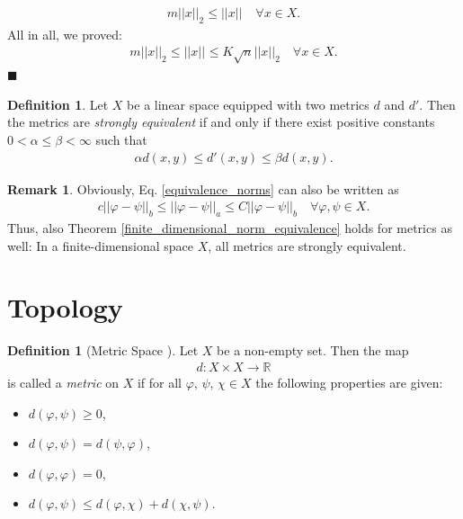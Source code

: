 \documentclass[12pt, a4paper]{article}
\numberwithin{equation}{section}
\theoremstyle{definition}
\theoremstyle{definition}
\newtheorem{defn}[thm]{Definition} %
\newtheorem{remark}[thm]{Remark} %
\newcommand{\norm}[2]{\left\vert\left\vert #1 \right\vert\right\vert_{#2}}
\begin{document}
	\begin{align}
		m\norm{x}{2} \leq \norm{x}{} \quad \forall x\in X.
	\end{align}
	All in all, we proved: 
	\begin{align}
		m\norm{x}{2} \leq \norm{x}{} \leq K\sqrt{n}\norm{x}{2} \quad \forall x\in X. 
	\end{align}
	\qquad\qquad\qquad\qquad\qquad\qquad\qquad\qquad\qquad\qquad\qquad\qquad\qquad\qquad\qquad\qquad\qquad\qquad\qquad\qquad\qquad\quad$\blacksquare$
	
	\begin{defn}
		Let $X$ be a linear space equipped with two metrics $d$ and $d'$. Then the metrics are \textit{strongly equivalent} if and only if there exist positive constants $0 < \alpha \leq \beta < \infty$ such that 
		\begin{align}
			\alpha d(x, y) \leq d'(x, y) \leq \beta d(x, y). 
		\end{align}
		\cite{equivalence-metrics}
	\end{defn}
	
	\begin{remark}\label{equivalence_metrics_finite_dimensional}
		Obviously, Eq. \eqref{equivalence_norms} can also be written as 
		\begin{align}
			c\norm{\varphi-\psi}{b} \leq \norm{\varphi-\psi}{a} \leq C\norm{\varphi-\psi}{b} \quad \forall \varphi, \psi\in X. 
		\end{align} 
		Thus, also Theorem \ref{finite_dimensional_norm_equivalence} holds for metrics as well: In a finite-dimensional space $X$, all metrics are strongly equivalent. 
	\end{remark}
	
	\newpage 
	\section{Topology}
	\begin{defn}[Metric Space \cite{fa2019}]\label{defn:metric_space}
		Let $X$ be a non-empty set. Then the map 
		\begin{align*}
			d: X\times X\rightarrow \mathbb R
		\end{align*}
		is called a \textit{metric} on $X$ if for all $\varphi$, $\psi$, $\chi\in X$ the following properties are given: 
		\begin{itemize}
			\item $d(\varphi, \psi) \geq 0$, 
			\item $d(\varphi, \psi) = d(\psi, \varphi)$, 
			\item $d(\varphi, \varphi) = 0$, 
			\item $d(\varphi, \psi) \leq d(\varphi, \chi) + d(\chi, \psi)$. 
		\end{itemize}
	\end{defn}
\end{document}
